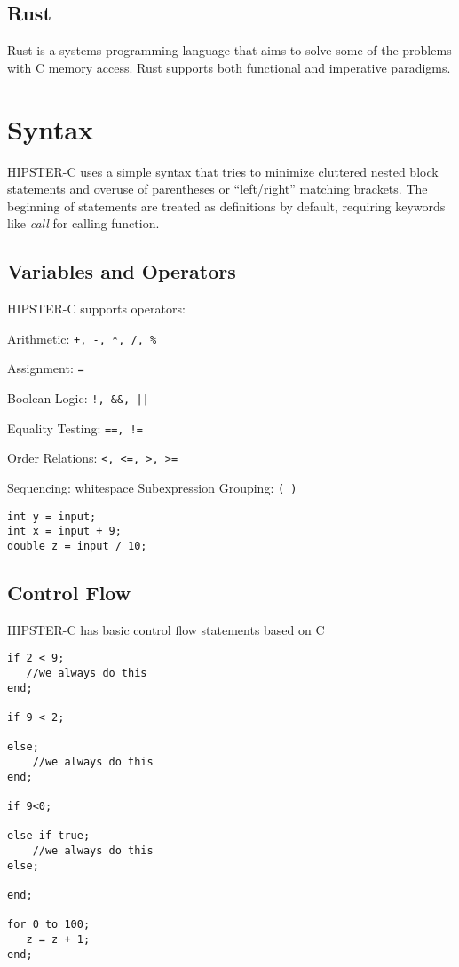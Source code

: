 \documentclass{article}
\begin{document}
\subsection{Rust}
Rust is a systems programming language that aims to solve some of the problems with C memory access. Rust supports both functional and imperative paradigms.




\section{Syntax}
HIPSTER-C uses a simple syntax that tries to minimize cluttered nested block statements and overuse of parentheses or ``left/right'' matching brackets. The beginning of statements are treated as definitions by default, requiring keywords like \textit{call} for calling function.  


\subsection{Variables and Operators}
HIPSTER-C supports operators:\par
Arithmetic: \texttt{+, -, *, /, \%}\par 
Assignment: \texttt{=}\par
Boolean Logic: \texttt{!, \&\&, ||}\par
Equality Testing: \texttt{==, !=}\par
Order Relations: \texttt{<, <=, >, >=}\par
Sequencing: whitespace
Subexpression Grouping: \texttt{( )}\par 



\begin{verbatim}
int y = input;
int x = input + 9;
double z = input / 10;
\end{verbatim}


\subsection{Control Flow}
HIPSTER-C has basic control flow statements based on C

\begin{verbatim}
if 2 < 9;
   //we always do this
end; 

if 9 < 2;

else;
    //we always do this
end;

if 9<0;

else if true;
    //we always do this
else;

end; 

for 0 to 100;
   z = z + 1;
end;

\end{verbatim}
\end{document}
